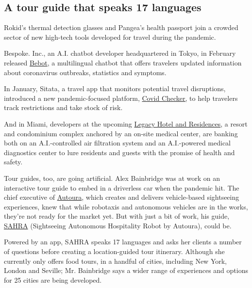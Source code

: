 \hypertarget{a-tour-guide-that-speaks-17-languages}{%
\subsection{A tour guide that speaks 17
languages}\label{a-tour-guide-that-speaks-17-languages}}

Rokid's thermal detection glasses and Pangea's health passport join a
crowded sector of new high-tech tools developed for travel during the
pandemic.

Bespoke. Inc., an A.I. chatbot developer headquartered in Tokyo, in
February released \href{https://www.be-spoke.io/bebot/}{Bebot}, a
multilingual chatbot that offers travelers updated information about
coronavirus outbreaks, statistics and symptoms.

In January, Sitata, a travel app that monitors potential travel
disruptions, introduced a new pandemic-focused platform,
\href{https://www.covidchecker.com/en/}{Covid Checker,} to help
travelers track restrictions and take stock of risk.

And in Miami, developers at the upcoming
\href{https://www.legacymwc.com/}{Legacy Hotel and Residences}, a resort
and condominium complex anchored by an on-site medical center, are
banking both on an A.I.-controlled air filtration system and an
A.I.-powered medical diagnostics center to lure residents and guests
with the promise of health and safety.

Tour guides, too, are going artificial. Alex Bainbridge was at work on
an interactive tour guide to embed in a driverless car when the pandemic
hit. The chief executive of \href{https://www.autoura.com/}{Autoura},
which creates and delivers vehicle-based sightseeing experiences, knew
that while robotaxis and autonomous vehicles are in the works, they're
not ready for the market yet. But with just a bit of work, his guide,
\href{https://apps.apple.com/us/app/sahra/id1515905101}{SAHRA}
(Sightseeing Autonomous Hospitality Robot by Autoura), could be.

Powered by an app, SAHRA speaks 17 languages and asks her clients a
number of questions before creating a location-guided tour itinerary.
Although she currently only offers food tours, in a handful of cities,
including New York, London and Seville; Mr. Bainbridge says a wider
range of experiences and options for 25 cities are being developed.

\href{https://www.nytimes3xbfgragh.onion/news-event/coronavirus?action=click\&pgtype=Article\&state=default\&region=MAIN_CONTENT_3\&context=storylines_faq}{}

